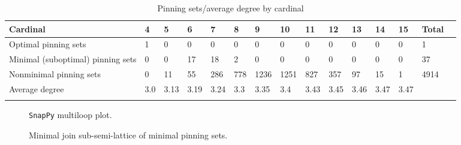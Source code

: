 \documentclass{article}%
\begin{document}
\begin{table}[ht]
	\caption{Pinning sets/average degree by cardinal}
	\centering
	\renewcommand{\arraystretch}{1.5}
	\begin{tabularx}{\textwidth}{lXXXXXXXXXXXXXX}
		\toprule
			Cardinal & 4 & 5 & 6 & 7 & 8 & 9 & 10 & 11 & 12 & 13 & 14 & 15 & Total\\
			\hline
			Optimal pinning sets & 1 & 0 & 0 & 0 & 0 & 0 & 0 & 0 & 0 & 0 & 0 & 0 & 1 \\
			Minimal (suboptimal) pinning sets & 0 & 0 & 17 & 18 & 2 & 0 & 0 & 0 & 0 & 0 & 0 & 0 & 37 \\
			Nonminimal pinning sets & 0 & 11 & 55 & 286 & 778 & 1236 & 1251 & 827 & 357 & 97 & 15 & 1 & 4914 \\
			Average degree & 3.0 & 3.13 & 3.19 & 3.24 & 3.3 & 3.35 & 3.4 & 3.43 & 3.45 & 3.46 & 3.47 & 3.47 &  \\
		\bottomrule \\ 
	\end{tabularx}
\end{table}

\begin{multicols}{2}
\begin{figure}[H]
\centering

\caption{\texttt{SnapPy} multiloop plot.}
\label{fig:tex/img/[[10, 18, 1, 11], [11, 19, 12, 26], [9, 25, 10, 26], [17, 24, 18, 25], [1, 6, 2, 7], [19, 7, 20, 8], [12, 8, 13, 9], [4, 16, 5, 17], [5, 23, 6, 24], [2, 15, 3, 14], [20, 14, 21, 13], [21, 3, 22, 4], [.svg}
\end{figure}
\columnbreak

\begin{figure}[H]
\centering
\scalebox{0.8}{}
\caption{Minimal join sub-semi-lattice of minimal pinning sets.}
\label{fig:tex/img/[[10, 18, 1, 11], [11, 19, 12, 26], [9, 25, 10, 26], [17, 24, 18, 25], [1, 6, 2, 7], [19, 7, 20, 8], [12, 8, 13, 9], [4, 16, 5, 17], [5, 23, 6, 24], [2, 15, 3, 14], [20, 14, 21, 13], [21, 3, 22, 4], [.pgf}
\end{figure}
\end{multicols}
\end{document}
